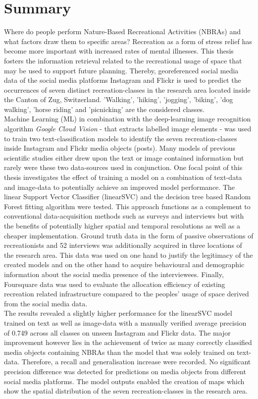 \chapter*{Summary}
Where do people perform Nature-Based Recreational Activities (NBRAs) and what factors draw them to specific areas? Recreation as a form of stress relief has become more important with increased rates of mental illnesses. This thesis fosters the information retrieval related to the recreational usage of space that may be used to support future planning. Thereby, georeferenced social media data of the social media platforms Instagram and Flickr is used to predict the occurrences of seven distinct recreation-classes in the research area located inside the Canton of Zug, Switzerland. 'Walking', 'hiking', 'jogging', 'biking', 'dog walking', 'horse riding' and 'picnicking' are the considered classes. \\
Machine Learning (ML) in combination with the deep-learning image recognition algorithm \textit{Google Cloud Vision} - that extracts labelled image elements - was used to train two text-classification models to identify the seven recreation-classes inside Instagram and Flickr media objects (posts). Many models of previous scientific studies either drew upon the text or image contained information but rarely were these two data-sources used in conjunction. One focal point of this thesis investigates the effect of training a model on a combination of text-data and image-data to potentially achieve an improved model performance. The linear Support Vector Classifier (linearSVC) and the decision tree based Random Forest fitting algorithm were tested. This approach functions as a complement to conventional data-acquisition methods such as surveys and interviews but with the benefits of potentially higher spatial and temporal resolutions as well as a cheaper implementation. Ground truth data in the form of passive observations of recreationists and 52 interviews was additionally acquired in three locations of the research area. This data was used on one hand to justify the legitimacy of the created models and on the other hand to acquire behavioural and demographic information about the social media presence of the interviewees. Finally, Foursquare data was used to evaluate the allocation efficiency of existing recreation related infrastructure compared to the peoples' usage of space derived from the social media data.\\
The results revealed a slightly higher performance for the linearSVC model trained on text as well as image-data with a manually verified average precision of 0.749 across all classes on unseen Instagram and Flickr data. The major improvement however lies in the achievement of twice as many correctly classified media objects containing NBRAs than the model that was solely trained on text-data. Therefore, a recall and generalisation increase were recorded. No significant precision difference was detected for predictions on media objects from different social media platforms.
The model outputs enabled the creation of maps which show the spatial distribution of the seven recreation-classes in the research area. \\

